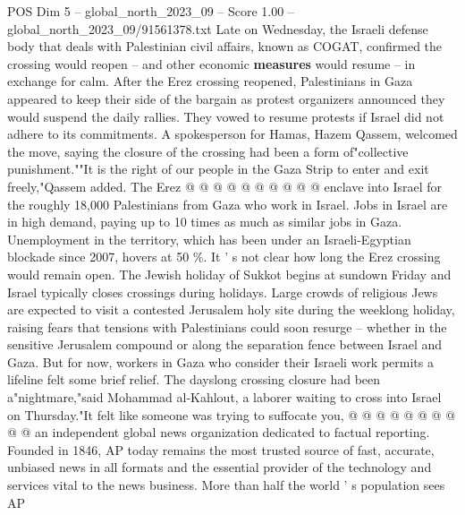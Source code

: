 \begin{textsample}{POS Dim 5 – global\_north\_2023\_09 – Score 1.00 – global\_north\_2023\_09/91561378.txt}
Late on Wednesday, the Israeli defense body that deals with Palestinian civil affairs, known as COGAT, confirmed the crossing would reopen -- and other economic \textbf{measures} would resume -- in exchange for calm.
After the Erez crossing reopened, Palestinians in Gaza appeared to keep their side of the bargain as protest organizers announced they would suspend the daily rallies.
They vowed to resume protests if Israel did not adhere to its commitments.
A spokesperson for Hamas, Hazem Qassem, welcomed the move, saying the closure of the crossing had been a form of"collective punishment.""It is the right of our people in the Gaza Strip to enter and exit freely,"Qassem added.
The Erez @ @ @ @ @ @ @ @ @ @ enclave into Israel for the roughly 18,000 Palestinians from Gaza who work in Israel.
Jobs in Israel are in high demand, paying up to 10 times as much as similar jobs in Gaza.
Unemployment in the territory, which has been under an Israeli-Egyptian blockade since 2007, hovers at 50 \%.
It ' s not clear how long the Erez crossing would remain open.
The Jewish holiday of Sukkot begins at sundown Friday and Israel typically closes crossings during holidays.
Large crowds of religious Jews are expected to visit a contested Jerusalem holy site during the weeklong holiday, raising fears that tensions with Palestinians could soon resurge -- whether in the sensitive Jerusalem compound or along the separation fence between Israel and Gaza.
But for now, workers in Gaza who consider their Israeli work permits a lifeline felt some brief relief.
The dayslong crossing closure had been a"nightmare,"said Mohammad al-Kahlout, a laborer waiting to cross into Israel on Thursday."It felt like someone was trying to suffocate you, @ @ @ @ @ @ @ @ @ @ an independent global news organization dedicated to factual reporting.
Founded in 1846, AP today remains the most trusted source of fast, accurate, unbiased news in all formats and the essential provider of the technology and services vital to the news business.
More than half the world ' s population sees AP

\end{textsample}
